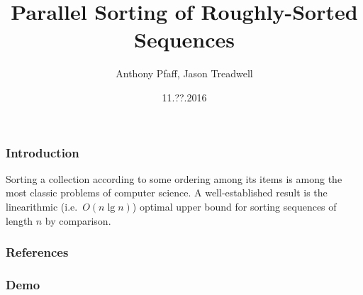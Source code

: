 \documentclass[10pt, xcolor={dvipsnames}, aspectratio=169]{beamer}
\title{Parallel Sorting of Roughly-Sorted Sequences}
\author{Anthony Pfaff, Jason Treadwell}
\institute{CSCI 5172 $|$ CU Denver $|$ Fall '16}
\date{11.??.2016}
\begin{document}

\nocite{*}
\renewcommand{\bibsection}{\subsubsection*{\bibname}}
\graphicspath{{./}}

\begin{frame}
\titlepage
\end{frame}

\begin{frame}
\transfade
\frametitle{Introduction}
Sorting a collection according to some ordering among its items is among the most classic problems of computer science.
A well-established result is the linearithmic  (i.e.\ $O(n \lg n)$) optimal upper bound for sorting sequences of length $n$ by
  comparison.
\end{frame}

\begin{frame}
\frametitle{References}
\smaller[1]{}
\end{frame}

\begin{frame}
\frametitle{Demo}
\end{frame}
\end{document}

